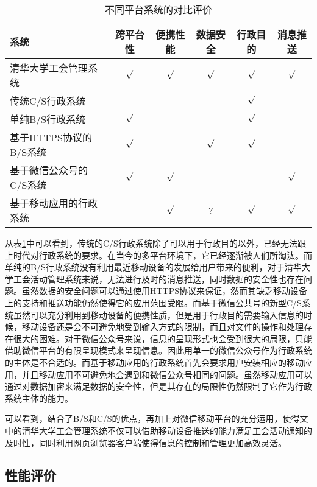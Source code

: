 \begin{table}
  \centering
  \caption{不同平台系统的对比评价}
  \label{table:compare}
    \begin{tabular}{lccccc}
      \toprule
      系统 & 跨平台性 & 便携性能 & 数据安全 & 行政目的 & 消息推送 \\
      \midrule %
      清华大学工会管理系统 		&$\surd$ &$\surd$ &$\surd$ &$\surd$ &$\surd$ \\
      传统C/S行政系统 			& & & &$\surd$ & \\
      单纯B/S行政系统 			&$\surd$ & & &$\surd$ & \\
      基于HTTPS协议的B/S系统 	&$\surd$ & &$\surd$ &$\surd$ & \\
      基于微信公众号的C/S系统 	&$\surd$ &$\surd$ & & &$\surd$ \\
      基于移动应用的行政系统 	& &$\surd$ & ? & $\surd$ & $\surd$\\
      \bottomrule
    \end{tabular}
\end{table}

从表\ref{table:compare}中可以看到，传统的C/S行政系统除了可以用于行政目的以外，已经无法跟上时代对行政系统的要求。在当今的多平台环境下，它已经逐渐被人们所淘汰。而单纯的B/S行政系统没有利用最近移动设备的发展给用户带来的便利，对于清华大学工会活动管理系统来说，无法进行及时的消息推送，同时数据的安全性也存在问题。虽然数据的安全问题可以通过使用HTTPS协议来保证，然而其缺乏移动设备上的支持和推送功能仍然使得它的应用范围受限。而基于微信公共号的新型C/S系统虽然可以充分利用到移动设备的便携性质，但是用于行政目的需要输入信息的时候，移动设备还是会不可避免地受到输入方式的限制，而且对文件的操作和处理存在很大的困难。对于微信公众号来说，信息的呈现形式也会受到很大的局限，只能借助微信平台的有限呈现模式来呈现信息。因此用单一的微信公众号作为行政系统的主体是不合适的。而基于移动应用的行政系统首先会要求用户安装相应的移动应用，并且移动应用不可避免地会遇到和微信公众号相同的问题。虽然移动应用可以通过对数据加密来满足数据的安全性，但是其存在的局限性仍然限制了它作为行政系统主体的能力。

可以看到，结合了B/S和C/S的优点，再加上对微信移动平台的充分运用，使得文中的清华大学工会管理系统不仅可以借助移动设备推送的能力满足工会活动通知的及时性，同时利用网页浏览器客户端使得信息的控制和管理更加高效灵活。

\subsection{性能评价}

